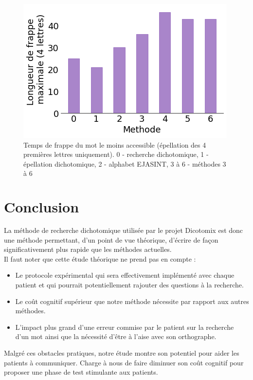 \documentclass[twoside,twocolumn]{article}
\begin{document}
\begin{center}
\begin{figure}
  \includegraphics[scale=0.5]{frappe-maxi4.png}
  \caption{Temps de frappe du mot le moins accessible (épellation des 4 premières lettres uniquement). 0 - recherche dichotomique, 1 - épellation dichotomique, 2 - alphabet EJASINT, 3 à 6 - méthodes 3 à 6}
  \label{maxi4}
\end{figure}
\end{center}


\section{Conclusion}

La méthode de recherche dichotomique utilisée par le projet Dicotomix est donc une méthode permettant, d'un point de vue théorique, d'écrire de façon significativement plus rapide que les méthodes actuelles. \\
Il faut noter que cette étude théorique ne prend pas en compte :
\begin{itemize}
\item Le protocole expérimental qui sera effectivement implémenté avec chaque patient et qui pourrait potentiellement rajouter des questions à la recherche.
\item Le coût cognitif supérieur que notre méthode nécessite par rapport aux autres méthodes.
\item L'impact plus grand d'une erreur commise par le patient sur la recherche d'un mot ainsi que la nécessité d'être à l'aise avec son orthographe.
\end{itemize} 

Malgré ces obstacles pratiques, notre étude montre son potentiel pour aider les patients à communiquer. Charge à nous de faire diminuer son coût cognitif pour proposer une phase de test stimulante aux patients. 
\end{document}
